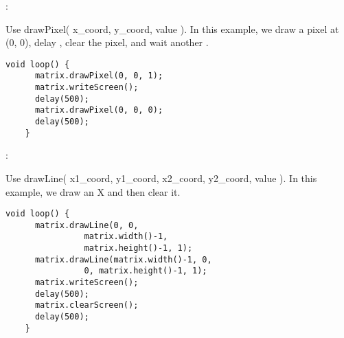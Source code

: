 \begin{minipage}[t]{0.45\tw}
  \vspace{0.0in}

  :
  \vspace{0.1in}

  Use drawPixel( x\_coord, y\_coord, value ). In this example, we draw a
  pixel at (0, 0), delay , clear the pixel, and wait another
  .

  \begin{Verbatim}[gobble=3,fontsize=\small]
    void loop() {
      matrix.drawPixel(0, 0, 1);
      matrix.writeScreen();
      delay(500);
      matrix.drawPixel(0, 0, 0);
      delay(500);
    }
  \end{Verbatim}

  :
  \vspace{0.1in}

  Use drawLine( x1\_coord, y1\_coord, x2\_coord, y2\_coord, value ). In this
example, we draw an X and then clear it.

  \begin{Verbatim}[gobble=3,fontsize=\small]
    void loop() {
      matrix.drawLine(0, 0,
                matrix.width()-1,
                matrix.height()-1, 1);
      matrix.drawLine(matrix.width()-1, 0,
                0, matrix.height()-1, 1);
      matrix.writeScreen();
      delay(500);
      matrix.clearScreen();
      delay(500);
    }
  \end{Verbatim}
\end{minipage}
\hspace{0.3in}

